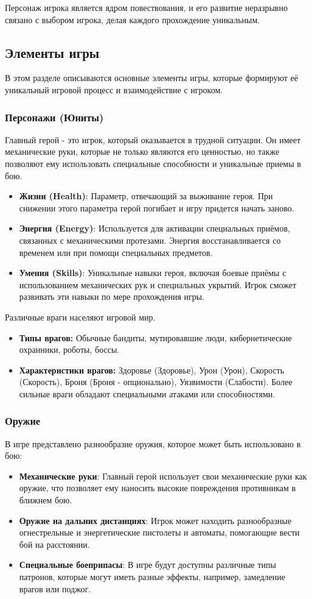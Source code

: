 \documentclass{article}
\begin{document}
Персонаж игрока является ядром повествования, и его развитие неразрывно связано с выбором игрока, делая каждого прохождение уникальным.

\subsection{Элементы игры}

В этом разделе описываются основные элементы игры, которые формируют её уникальный игровой процесс и взаимодействие с игроком.
\subsubsection{Персонажи (Юниты)}
Главный герой - это игрок, который оказывается в трудной ситуации. Он имеет механические руки, которые не только являются его ценностью, но также позволяют ему использовать специальные способности и уникальные приемы в бою.
\begin{itemize}
   \item \textbf{Жизни (Health)}: Параметр, отвечающий за выживание героя. При снижении этого параметра герой погибает и игру придется начать заново.
    \item \textbf{Энергия (Energy)}: Используется для активации специальных приёмов, связанных с механическими протезами. Энергия восстанавливается со временем или при помощи специальных предметов.
    \item \textbf{Умения (Skills)}: Уникальные навыки героя, включая боевые приёмы с использованием механических рук и специальных укрытий. Игрок сможет развивать эти навыки по мере прохождения игры.

\end{itemize}
Различные враги населяют игровой мир.

\begin{itemize} 
     \item \textbf{Типы врагов:} Обычные бандиты, мутировавшие люди, кибернетические охранники, роботы, боссы. 
     \item \textbf{Характеристики врагов:} Здоровье (Здоровье), Урон (Урон), Скорость (Скорость), Броня (Броня - опционально), Уязвимости (Слабости). Более сильные враги обладают специальными атаками или способностями.
\end{itemize}
\subsubsection{Оружие}
В игре представлено разнообразие оружия, которое может быть использовано в бою:
\begin{itemize}
    \item \textbf{Механические руки}: Главный герой использует свои механические руки как оружие, что позволяет ему наносить высокие повреждения противникам в ближнем бою.
    \item \textbf{Оружие на дальних дистанциях}: Игрок может находить разнообразные огнестрельные и энергетические пистолеты и автоматы, помогающие вести бой на расстоянии.
    \item \textbf{Специальные боеприпасы}: В игре будут доступны различные типы патронов, которые могут иметь разные эффекты, например, замедление врагов или поджог.
\end{itemize}
\end{document}

